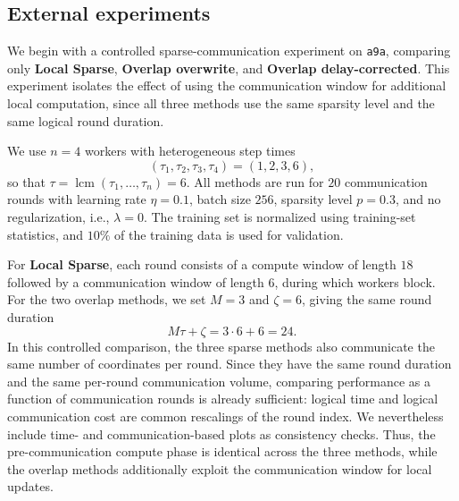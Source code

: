 \documentclass{article}
\theoremstyle{plain}
\theoremstyle{definition}
\begin{document}
\subsection{External experiments}
\label{subsec:a9a-sparse-overlap}

We begin with a controlled sparse-communication experiment on \texttt{a9a}, comparing only 
\textbf{Local Sparse}, \textbf{Overlap overwrite}, and \textbf{Overlap delay-corrected}. 
This experiment isolates the effect of using the communication window for additional local computation, since all three methods use the same sparsity level and the same logical round duration.

We use $n=4$ workers with heterogeneous step times
\begin{equation}
    (\tau_1,\tau_2,\tau_3,\tau_4) = (1,2,3,6),
\end{equation}
so that $\tau=\operatorname{lcm}(\tau_1,\ldots,\tau_n)=6$. 
All methods are run for $20$ communication rounds with learning rate $\eta=0.1$, batch size $256$, sparsity level $p=0.3$, and no regularization, i.e., $\lambda=0$. 
The training set is normalized using training-set statistics, and $10\%$ of the training data is used for validation.

For \textbf{Local Sparse}, each round consists of a compute window of length $18$ followed by a communication window of length $6$, during which workers block. 
For the two overlap methods, we set $M=3$ and $\zeta=6$, giving the same round duration
\begin{equation}
    M\tau+\zeta = 3\cdot 6 + 6 = 24.
\end{equation}
In this controlled comparison, the three sparse methods also communicate the same number of coordinates per round. 
Since they have the same round duration and the same per-round communication volume, comparing performance as a function of communication rounds is already sufficient: logical time and logical communication cost are common rescalings of the round index. 
We nevertheless include time- and communication-based plots as consistency checks.
Thus, the pre-communication compute phase is identical across the three methods, while the overlap methods additionally exploit the communication window for local updates.
\end{document}
